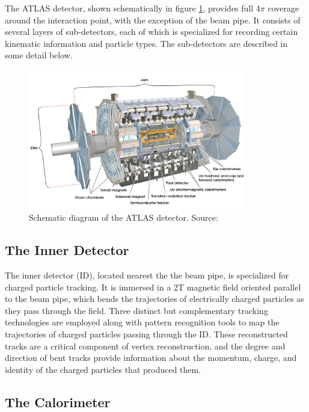 \documentclass[12pt]{article}
\begin{document}
The ATLAS detector, shown schematically in figure \ref{fig:detector}, provides full 4$\pi$ coverage around the interaction point, with the exception of the beam pipe. It consists of several layers of sub-detectors, each of which is specialized for recording certain kinematic information and particle types. The sub-detectors are described in some detail below. 

\begin{figure}[H]
	\centering
	\includegraphics[width=0.85\textwidth]{figures/detector.jpg}
	\caption[]{Schematic diagram of the ATLAS detector. Source: \cite{atlas}}
	\label{fig:detector}
\end{figure}

\subsection{The Inner Detector}

The inner detector (ID), located nearest the the beam pipe, is specialized for charged particle tracking. It is immersed in a 2T magnetic field oriented parallel to the beam pipe, which bends the trajectories of electrically charged particles as they pass through the field. Three distinct but complementary tracking technologies are employed along with pattern recognition tools to map the trajectories of charged particles passing through the ID. These reconstructed tracks are a critical component of vertex reconstruction, and the degree and direction of bent tracks provide information about the momentum, charge, and identity of the charged particles that produced them. 

\subsection{The Calorimeter}
\end{document}
